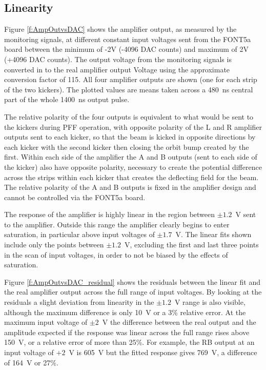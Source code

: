 \subsection{Linearity}
\label{ss:ampLin}

Figure \ref{f:AmpOutvsDAC} shows the amplifier output, as measured by the monitoring signals, at different constant input voltages sent from the FONT5a board between the minimum of -2V (-4096 DAC counts) and maximum of 2V (+4096 DAC counts). The output voltage from the monitoring signals is converted in to the real amplifier output Voltage using the approximate conversion factor of 115. All four amplifier outputs are shown (one for each strip of the two kickers). The plotted values are means taken across a 480~ns central part of the whole 1400~ns output pulse.

The relative polarity of the four outputs is equivalent to what would be sent to the kickers during PFF operation, with opposite polarity of the L and R amplifier outputs sent to each kicker, so that the beam is kicked in opposite directions by each kicker with the second kicker then closing the orbit bump created by the first. Within each side of the amplifier the A and B outputs (sent to each side of the kicker) also have opposite polarity, necessary to create the potential difference across the strips within each kicker that creates the deflecting field for the beam. The relative polarity of the A and B outputs is fixed in the amplifier design and cannot be controlled via the FONT5a board.

The response of the amplifier is highly linear in the region between \(\pm1.2\)~V sent to the amplifier. Outside this range the amplifier clearly begins to enter saturation, in particular above input voltages of \(\pm1.7\)~V. The linear fits shown include only the points between \(\pm1.2\)~V, excluding the first and last three points in the scan of input voltages, in order to not be biased by the effects of saturation.

Figure \ref{f:AmpOutvsDAC_residual} shows the residuals between the linear fit and the real amplifier output across the full range of input voltages. By looking at the residuals a slight deviation from linearity in the \(\pm1.2\)~V range is also visible, although the maximum difference is only 10~V or a 3\% relative error. At the maximum input voltage of \(\pm2\)~V the difference between the real output and the amplitude expected if the response was linear across the full range rises above 150~V, or a relative error of more than 25\%. For example, the RB output at an input voltage of \(+2\)~V is 605~V but the fitted response gives 769~V, a difference of 164~V or 27\%.

